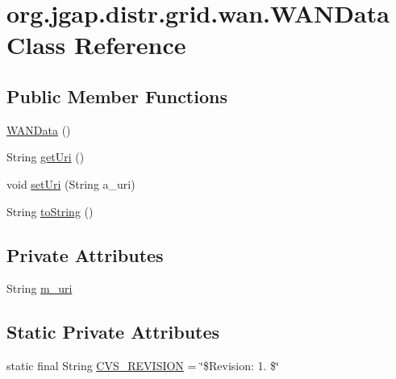 \hypertarget{classorg_1_1jgap_1_1distr_1_1grid_1_1wan_1_1_w_a_n_data}{\section{org.\-jgap.\-distr.\-grid.\-wan.\-W\-A\-N\-Data Class Reference}
\label{classorg_1_1jgap_1_1distr_1_1grid_1_1wan_1_1_w_a_n_data}
}
\subsection*{Public Member Functions}
\begin{DoxyCompactItemize}
\item 
\hyperlink{classorg_1_1jgap_1_1distr_1_1grid_1_1wan_1_1_w_a_n_data_abc77edb1433804fec844976b48361d3b}{W\-A\-N\-Data} ()
\item 
String \hyperlink{classorg_1_1jgap_1_1distr_1_1grid_1_1wan_1_1_w_a_n_data_ab82a47f82b9c7a2772b72a70666f72d9}{get\-Uri} ()
\item 
void \hyperlink{classorg_1_1jgap_1_1distr_1_1grid_1_1wan_1_1_w_a_n_data_ac9168065871754233fe823b67f6e1286}{set\-Uri} (String a\-\_\-uri)
\item 
String \hyperlink{classorg_1_1jgap_1_1distr_1_1grid_1_1wan_1_1_w_a_n_data_a6d38071036caf2c88376e1f75e96021c}{to\-String} ()
\end{DoxyCompactItemize}
\subsection*{Private Attributes}
\begin{DoxyCompactItemize}
\item 
String \hyperlink{classorg_1_1jgap_1_1distr_1_1grid_1_1wan_1_1_w_a_n_data_af084d83b22c01740477ac4210859454d}{m\-\_\-uri}
\end{DoxyCompactItemize}
\subsection*{Static Private Attributes}
\begin{DoxyCompactItemize}
\item 
static final String \hyperlink{classorg_1_1jgap_1_1distr_1_1grid_1_1wan_1_1_w_a_n_data_a272e851b0485552abf0d14de2ea0e0bf}{C\-V\-S\-\_\-\-R\-E\-V\-I\-S\-I\-O\-N} = \char`\"{}\$Revision\-: 1. \$\char`\"{}
\end{DoxyCompactItemize}


